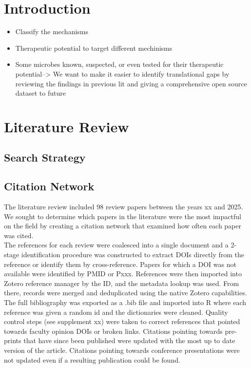 \documentclass[11pt,a4paper]{article}
\begin{document}
\newpage
\section{Introduction}
\begin{itemize}
\item Classify the mechanisms
\item Therapeutic potential to target different mechinisms
\item Some microbes known, suspected, or even tested for their therapeutic potential--> We want to make it easier to identify translational gaps by reviewing the findings in previous lit and giving a comprehensive open source dataset to future
\end{itemize}

\newpage
\section{Literature Review}
\subsection{Search Strategy}
\subsection{Citation Network}
The literature review included 98 review papers between the years xx and 2025. We sought to determine which papers in the literature were the most impactful on the field by creating a citation network that examined how often each paper was cited. \\

The references for each review were coalesced into a single document and a 2-stage identification procedure was constructed to extract DOIs directly from the reference or identify them by cross-reference. Papers for which a DOI was not available were identified by PMID or Pxxx. References were then imported into Zotero reference manager by the ID, and the metadata lookup was used. From there, records were merged and deduplicated using the native Zotero capabilities. The full bibliography was exported as a .bib file and imported into R where each reference was given a random id and the dictionaries were cleaned. Quality control steps (see supplement xx) were taken to correct references that pointed towards faculty opinion DOIs or broken links. Citations pointing towards pre-prints that have since been published were updated with the most up to date version of the article. Citations pointing towards conference presentations were not updated even if a resulting publication could be found. 
\end{document}
